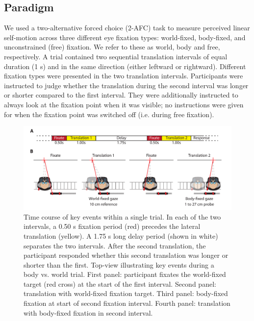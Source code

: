 \subsection{Paradigm}
We used a two-alternative forced choice (2-AFC) task to measure perceived linear self-motion across three different eye fixation types: world-fixed, body-fixed, and unconstrained (free) fixation. We refer to these as world, body and free, respectively. A trial contained two sequential translation intervals of equal duration (1 \si{\second}) and in the same direction (either leftward or rightward). Different fixation types were presented in the two translation intervals. Participants were instructed to judge whether the translation during the second interval was longer or shorter compared to the first interval. They were additionally instructed to always look at the fixation point when it was visible; no instructions were given for when the fixation point was switched off (i.e. during free fixation).

\begin{figure}
    \includegraphics[width=1.0\textwidth]{src/paper3/figure1.pdf}

    \caption{ Time course of key events within a single trial. In each of the two intervals, a 0.50 \si{\second} fixation period (red) precedes the lateral translation (yellow). A 1.75 \si{\second} long delay period (shown in white) separates the two intervals. After the second translation, the participant responded whether this second translation was longer or shorter than the first.  Top-view illustrating key events during a body vs. world trial. First panel: participant fixates the world-fixed target (red cross) at the start of the first interval. Second panel: translation with world-fixed fixation target. Third panel: body-fixed fixation at start of second fixation interval. Fourth panel: translation with body-fixed fixation in second interval.}
    \label{p3:fig1}    
\end{figure}

